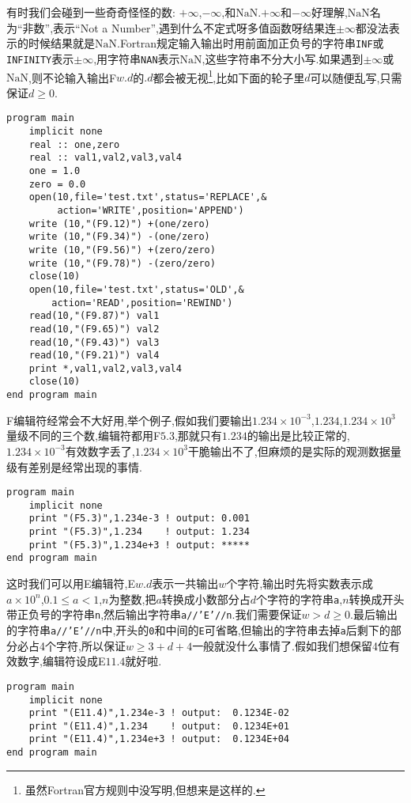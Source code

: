 有时我们会碰到一些奇奇怪怪的数: $+\infty$,$-\infty$,和$\text{NaN}$.$+\infty$和$-\infty$好理解,$\text{NaN}$名为``非数'',表示``Not a Number'',遇到什么不定式呀多值函数呀结果连$\pm\infty$都没法表示的时候结果就是$\text{NaN}$.Fortran规定输入输出时用前面加正负号的字符串\texttt{INF}或\texttt{INFINITY}表示$\pm\infty$,用字符串\texttt{NAN}表示$\text{NaN}$,这些字符串不分大小写.如果遇到$\pm\infty$或$\text{NaN}$,则不论输入输出F$w.d$的$.d$都会被无视\footnote{虽然Fortran官方规则中没写明,但想来是这样的.\label{edit_IEEE}},比如下面的轮子里$d$可以随便乱写,只需保证$d\geqslant0$.
\begin{lstlisting}
program main
    implicit none
    real :: one,zero
    real :: val1,val2,val3,val4
    one = 1.0
    zero = 0.0
    open(10,file='test.txt',status='REPLACE',&
         action='WRITE',position='APPEND')
    write (10,"(F9.12)") +(one/zero)
    write (10,"(F9.34)") -(one/zero)
    write (10,"(F9.56)") +(zero/zero)
    write (10,"(F9.78)") -(zero/zero)
    close(10)
    open(10,file='test.txt',status='OLD',&
        action='READ',position='REWIND')
    read(10,"(F9.87)") val1
    read(10,"(F9.65)") val2
    read(10,"(F9.43)") val3
    read(10,"(F9.21)") val4
    print *,val1,val2,val3,val4
    close(10)
end program main
\end{lstlisting}

F编辑符经常会不大好用,举个例子,假如我们要输出$1.234\times10^{-3}$,$1.234$,$1.234\times10^{3}$量级不同的三个数,编辑符都用F$5.3$,那就只有$1.234$的输出是比较正常的,$1.234\times10^{-3}$有效数字丢了,$1.234\times10^{3}$干脆输出不了,但麻烦的是实际的观测数据量级有差别是经常出现的事情.
\begin{lstlisting}
program main
    implicit none
    print "(F5.3)",1.234e-3 ! output: 0.001
    print "(F5.3)",1.234    ! output: 1.234
    print "(F5.3)",1.234e+3 ! output: *****
end program main
\end{lstlisting}
这时我们可以用E编辑符,E$w.d$表示一共输出$w$个字符,输出时先将实数表示成$a\times10^{n}$,$0.1\leqslant a<1$,$n$为整数,把$a$转换成小数部分占$d$个字符的字符串\texttt{a},$n$转换成开头带正负号的字符串\texttt{n},然后输出字符串\texttt{a//'E'//n}.我们需要保证$w>d\geqslant0$.最后输出的字符串\texttt{a//'E'//n}中,开头的\texttt{0}和中间的\texttt{E}可省略,但输出的字符串去掉\texttt{a}后剩下的部分必占4个字符,所以保证$w\geqslant 3+d+4$一般就没什么事情了.假如我们想保留4位有效数字,编辑符设成E$11.4$就好啦.
\begin{lstlisting}
program main
    implicit none
    print "(E11.4)",1.234e-3 ! output:  0.1234E-02
    print "(E11.4)",1.234    ! output:  0.1234E+01
    print "(E11.4)",1.234e+3 ! output:  0.1234E+04
end program main
\end{lstlisting}

